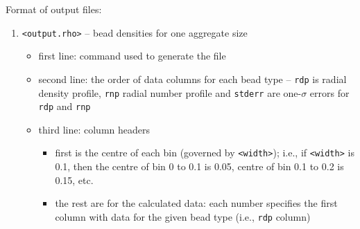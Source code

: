 \noindent
Format of output files:
\begin{enumerate}[nosep,leftmargin=20pt]
  \item \texttt{<output.rho>} -- bead densities for one aggregate size
    \begin{itemize}[nosep,leftmargin=5pt]
      \item first line: command used to generate the file
      \item second line: the order of data columns for each bead type --
        \texttt{rdp} is radial density profile, \texttt{rnp} radial number
        profile and \texttt{stderr} are one-$\sigma$ errors for \texttt{rdp}
        and \texttt{rnp}
      \item third line: column headers
        \begin{itemize}[nosep,leftmargin=10pt]
          \item first is the centre of each bin (governed by
            \texttt{<width>}); i.e., if \texttt{<width>} is 0.1,
            then the centre of bin 0 to 0.1 is 0.05, centre of bin 0.1 to
            0.2 is 0.15, etc.
          \item the rest are for the calculated data: each number specifies
            the first column with data for the given bead type (i.e.,
            \texttt{rdp} column)
        \end{itemize}
    \end{itemize}
\end{enumerate}
